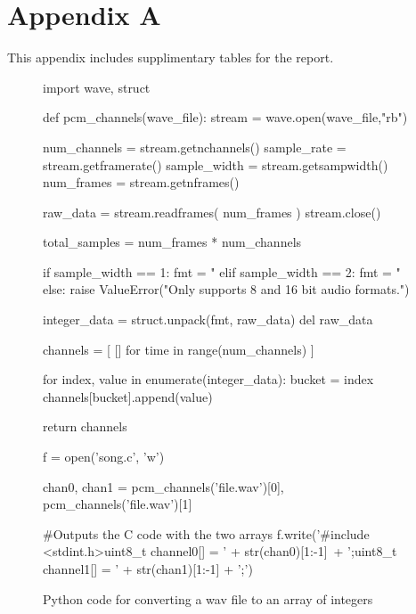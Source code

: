 \section{Appendix A}
\label{appenix:a}

This appendix includes supplimentary tables for the report.

\begin{figure}[ht!]
\begin{code}
import wave, struct

def pcm_channels(wave_file):
    stream = wave.open(wave_file,"rb")

    num_channels = stream.getnchannels()
    sample_rate = stream.getframerate()
    sample_width = stream.getsampwidth()
    num_frames = stream.getnframes()

    raw_data = stream.readframes( num_frames )
    stream.close()

    total_samples = num_frames * num_channels

    if sample_width == 1: 
        fmt = "%
    elif sample_width == 2:
        fmt = "%
    else:
        raise ValueError("Only supports 8 and 16 bit audio formats.")

    integer_data = struct.unpack(fmt, raw_data)
    del raw_data

    channels = [ [] for time in range(num_channels) ]

    for index, value in enumerate(integer_data):
        bucket = index %
        channels[bucket].append(value)

    return channels

f = open('song.c', 'w')

chan0, chan1 = pcm_channels('file.wav')[0], pcm_channels('file.wav')[1]

#Outputs the C code with the two arrays
f.write('#include <stdint.h>\n\nconst uint8_t channel0[] = {' + str(chan0)[1:-1]\
 + '};\n\nconst uint8_t channel1[] = {' + str(chan1)[1:-1] + '};')

\end{code}
\caption{Python code for converting a wav file to an array of integers}
\label{fig:python}
\end{figure}
